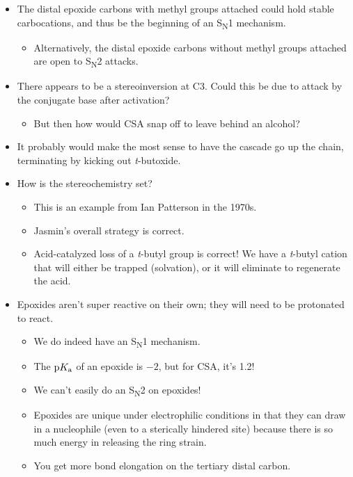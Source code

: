 \documentclass[../notes.tex]{subfiles}
\begin{document}
\begin{itemize}
\begin{figure}[h!]
        \label{fig:PSet2Q1}
    \end{figure}
    \item The distal epoxide carbons with methyl groups attached could hold stable carbocations, and thus be the beginning of an S\textsubscript{N}1 mechanism.
    \begin{itemize}
        \item Alternatively, the distal epoxide carbons without methyl groups attached are open to S\textsubscript{N}2 attacks.
    \end{itemize}
    \item There appears to be a stereoinversion at C3. Could this be due to attack by the conjugate base after activation?
    \begin{itemize}
        \item But then how would CSA snap off to leave behind an alcohol?
    \end{itemize}
    \item It probably would make the most sense to have the cascade go up the chain, terminating by kicking out \emph{t}-butoxide.
    \item How is the stereochemistry set?
    \begin{itemize}
        \item This is an example from Ian Patterson in the 1970s.
        \item Jasmin's overall strategy is correct.
        \item Acid-catalyzed loss of a \emph{t}-butyl group is correct! We have a \emph{t}-butyl cation that will either be trapped (solvation), or it will eliminate to regenerate the acid.
    \end{itemize}
    \item Epoxides aren't super reactive on their own; they will need to be protonated to react.
    \begin{itemize}
        \item We do indeed have an S\textsubscript{N}1 mechanism.
        \item The $\textup{p}K_\textup{a}$ of an epoxide is $-2$, but for CSA, it's 1.2!
        \item We can't easily do an S\textsubscript{N}2 on epoxides!
        \item Epoxides are unique under electrophilic conditions in that they can draw in a nucleophile (even to a sterically hindered site) because there is so much energy in releasing the ring strain.
        \item You get more bond elongation on the tertiary distal carbon.

\end{itemize}
\end{itemize}
\end{document}
